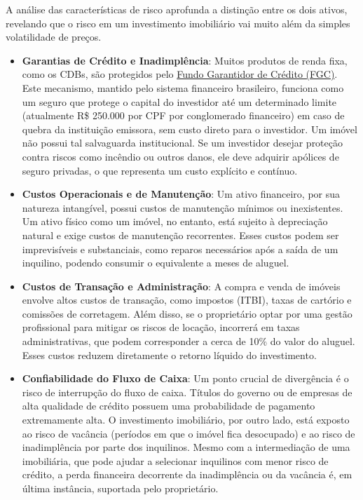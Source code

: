 \documentclass[
  a4paper,
]{book}
\begin{document}
A análise das características de risco aprofunda a distinção entre os
dois ativos, revelando que o risco em um investimento imobiliário vai
muito além da simples volatilidade de preços.

\begin{itemize}
\item
  \textbf{Garantias de Crédito e Inadimplência}: Muitos produtos de
  renda fixa, como os CDBs, são protegidos pelo
  \href{https://www.bb.com.br/site/investimentos/fgc/}{Fundo Garantidor
  de Crédito (FGC)}. Este mecanismo, mantido pelo sistema financeiro
  brasileiro, funciona como um seguro que protege o capital do
  investidor até um determinado limite (atualmente R\$ 250.000 por CPF
  por conglomerado financeiro) em caso de quebra da instituição
  emissora, sem custo direto para o investidor. Um imóvel não possui tal
  salvaguarda institucional. Se um investidor desejar proteção contra
  riscos como incêndio ou outros danos, ele deve adquirir apólices de
  seguro privadas, o que representa um custo explícito e contínuo.
\item
  \textbf{Custos Operacionais e de Manutenção}: Um ativo financeiro, por
  sua natureza intangível, possui custos de manutenção mínimos ou
  inexistentes. Um ativo físico como um imóvel, no entanto, está sujeito
  à depreciação natural e exige custos de manutenção recorrentes. Esses
  custos podem ser imprevisíveis e substanciais, como reparos
  necessários após a saída de um inquilino, podendo consumir o
  equivalente a meses de aluguel.
\item
  \textbf{Custos de Transação e Administração}: A compra e venda de
  imóveis envolve altos custos de transação, como impostos (ITBI), taxas
  de cartório e comissões de corretagem. Além disso, se o proprietário
  optar por uma gestão profissional para mitigar os riscos de locação,
  incorrerá em taxas administrativas, que podem corresponder a cerca de
  10\% do valor do aluguel. Esses custos reduzem diretamente o retorno
  líquido do investimento.
\item
  \textbf{Confiabilidade do Fluxo de Caixa}: Um ponto crucial de
  divergência é o risco de interrupção do fluxo de caixa. Títulos do
  governo ou de empresas de alta qualidade de crédito possuem uma
  probabilidade de pagamento extremamente alta. O investimento
  imobiliário, por outro lado, está exposto ao risco de vacância
  (períodos em que o imóvel fica desocupado) e ao risco de inadimplência
  por parte dos inquilinos. Mesmo com a intermediação de uma
  imobiliária, que pode ajudar a selecionar inquilinos com menor risco
  de crédito, a perda financeira decorrente da inadimplência ou da
  vacância é, em última instância, suportada pelo proprietário.
\end{itemize}
\end{document}
